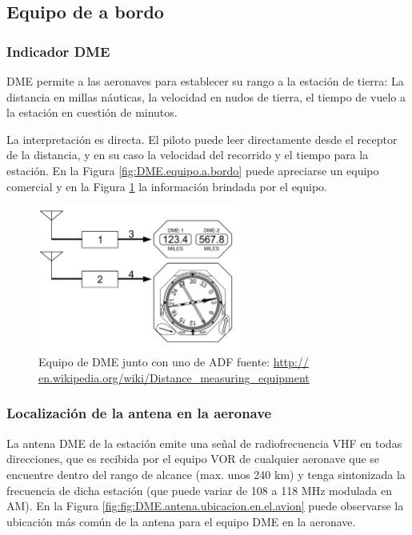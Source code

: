\subsection{Equipo de a bordo }
\label{sec:DME.equipo.a.bordo}

\subsubsection{Indicador DME}
\label{sec:DME.indicador}

DME permite a las aeronaves para establecer su rango a la estaci\'on de tierra: La distancia en millas n\'auticas, la velocidad en nudos de tierra, el tiempo de vuelo a la estaci\'on en cuesti\'on de minutos. 

La interpretaci\'on es directa. El piloto puede leer directamente desde el receptor de la distancia, y en su caso la velocidad del recorrido y el tiempo para la estaci\'on.  En la Figura \ref{fig:DME.equipo.a.bordo} puede apreciarse un equipo comercial y en la Figura \ref{fig:DME.instalacion.a.bordo} la informaci\'on brindada por el equipo.


\begin{figure}[!h]
  \centering
  \includegraphics[width=0.6\textwidth]{Imagenes/06.04.dme.imagenes/DME_VOR_avionics.PNG}
  \caption{Equipo de DME junto con uno de ADF 
{\tiny fuente: \url{http://
en.wikipedia.org/wiki/Distance_measuring_equipment
}}
}
  \label{fig:DME.instalacion.a.bordo}
\end{figure}


\subsubsection{Localizaci\'on de la antena en la aeronave}
\label{sec:DME.localizacion.antena.aeronave}

La antena DME de la estaci\'on emite una se\~nal de radiofrecuencia VHF en todas direcciones, que es recibida por el equipo VOR de cualquier aeronave que se encuentre dentro del rango de alcance (max. unos 240 km) y tenga sintonizada la frecuencia de dicha estaci\'on (que puede variar de 108 a 118 MHz modulada en AM). En la Figura \ref{fig:fig:DME.antena.ubicacion.en.el.avion} puede observarse la ubicaci\'on m\'as com\'un de la antena para el equipo DME en la aeronave.

